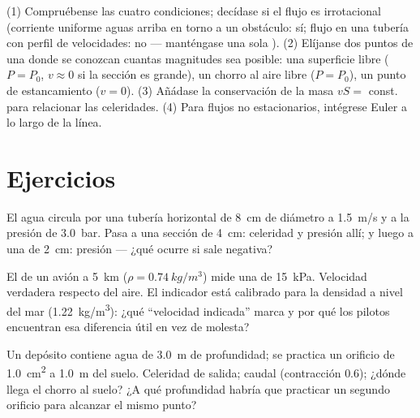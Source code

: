 \begin{method}\label{met:b2:euler-bernoulli:method}
(1) Compruébense las cuatro condiciones; decídase si el flujo es
irrotacional (corriente uniforme aguas arriba en torno a un obstáculo: sí;
flujo en una tubería con perfil de velocidades: no --- manténgase una sola
). (2) Elíjanse dos puntos de una 
donde se conozcan cuantas magnitudes sea posible: una superficie libre
($P = P_0$, $v \approx 0$ si la sección es grande), un chorro al aire libre
($P = P_0$), un punto de estancamiento ($v = 0$). (3) Añádase la
conservación de la masa $vS = $ const. para relacionar las celeridades.
(4) Para flujos no estacionarios, intégrese Euler a lo largo de la línea.
\end{method}

\section{Ejercicios}

\begin{exercise}[$\star$]\label{exo:b2:euler-bernoulli:1}
El agua circula por una tubería horizontal de \qty{8}{cm} de diámetro a
\qty{1.5}{m/s} y a la presión de \qty{3.0}{bar}. Pasa a una sección de
\qty{4}{cm}: celeridad y presión allí; y luego a una de \qty{2}{cm}:
presión --- ¿qué ocurre si sale negativa?
\end{exercise}

\begin{exercise}[$\star$]\label{exo:b2:euler-bernoulli:2}
El  de un avión a \qty{5}{km} ($\rho = \qty{0.74}{kg/m^3}$)
mide una  de \qty{15}{kPa}. Velocidad verdadera respecto
del aire. El indicador está calibrado para la densidad a nivel del mar
(\qty{1.22}{kg/m^3}): ¿qué ``velocidad indicada'' marca y por qué los
pilotos encuentran esa diferencia útil en vez de molesta?
\end{exercise}

\begin{exercise}[$\star$]\label{exo:b2:euler-bernoulli:3}
Un depósito contiene agua de \qty{3.0}{m} de profundidad; se practica un
orificio de \qty{1.0}{cm^2} a \qty{1.0}{m} del suelo. Celeridad de salida;
caudal (contracción $0.6$); ¿dónde llega el chorro al suelo? ¿A qué
profundidad habría que practicar un segundo orificio para alcanzar el mismo punto?
\end{exercise}

